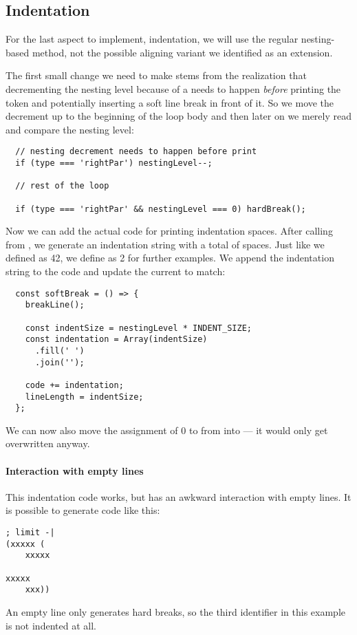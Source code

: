 \subsection{Indentation}
For the last aspect to implement, indentation,
we will use the regular nesting-based method,
not the possible aligning variant
we identified as an extension.

The first small change we need to make
stems from the realization that
decrementing the nesting level
because of a  needs to happen
\textit{before} printing the token
and potentially inserting a
soft line break in front of it.
So we move the decrement up
to the beginning of the loop body
and then later on we merely
read and compare the nesting level:
\begin{verbatim}
  // nesting decrement needs to happen before print
  if (type === 'rightPar') nestingLevel--;

  // rest of the loop

  if (type === 'rightPar' && nestingLevel === 0) hardBreak();
\end{verbatim}

Now we can add the actual code for printing indentation spaces.
After calling  from ,
we generate an indentation string with
a total of  spaces.
Just like we defined  as 42,
we define  as 2 for further examples.
We append the indentation string to the code
and update the current  to match:
\begin{verbatim}
  const softBreak = () => {
    breakLine();

    const indentSize = nestingLevel * INDENT_SIZE;
    const indentation = Array(indentSize)
      .fill(' ')
      .join('');

    code += indentation;
    lineLength = indentSize;
  };
\end{verbatim}
We can now also move the assignment of 0 to 
from  into  ---
it would only get overwritten anyway.

\paragraph{Interaction with empty lines}
This indentation code works,
but has an awkward interaction with empty lines.
It is possible to generate code like this:
\begin{verbatim}
; limit -|
(xxxxx (
    xxxxx

xxxxx
    xxx))
\end{verbatim}
An empty line only generates hard breaks,
so the third identifier in this example
is not indented at all.

